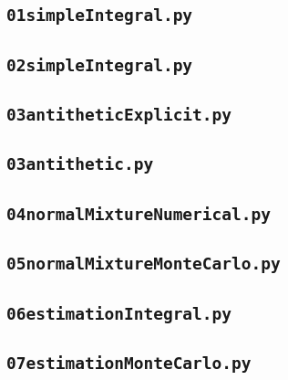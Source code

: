 \documentclass[12pt,a4paper]{article}
\begin{document}
\subsection{\lstinline$01simpleIntegral.py$}
\label{sec:01simpleIntegral}


\subsection{\lstinline$02simpleIntegral.py$}
\label{sec:02simpleIntegral}


\subsection{\lstinline$03antitheticExplicit.py$}
\label{sec:03antitheticExplicit}


\subsection{\lstinline$03antithetic.py$}
\label{sec:03antithetic}


\subsection{\lstinline$04normalMixtureNumerical.py$}
\label{sec:04normalMixtureNumerical}


\subsection{\lstinline$05normalMixtureMonteCarlo.py$}
\label{sec:05normalMixtureMonteCarlo}


\subsection{\lstinline$06estimationIntegral.py$}
\label{sec:06estimationIntegral}


\subsection{\lstinline$07estimationMonteCarlo.py$}
\label{sec:07estimationMonteCarlo}





\clearpage 



\end{document}
